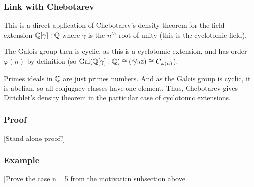 \subsubsection{Link with Chebotarev}
This is a direct application of Chebotarev's density theorem for the field extension $\mathbb{Q}[\gamma]:\mathbb{Q}$ where $\gamma$ is the $n^{th}$ root of unity (this is the cyclotomic field).

The Galois group then is cyclic, as this is a cyclotomic extension, and has order $\varphi(n)$ by definition (so $\text{Gal}(\mathbb{Q}[\gamma]:\mathbb{Q}) \cong \left( \nicefrac{\mathbb{Z}}{n\mathbb{Z}} \right) \cong C_{\varphi(n)}$).

Primes ideals in $\mathbb{Q}$ are just primes numbers. And as the Galois group is cyclic, it is abelian, so all conjugacy classes have one element.
Thus, Chebotarev gives Dirichlet's density theorem in the particular case of cyclotomic extensions.

\subsubsection{Proof}
[Stand alone proof?]

\subsubsection{Example}
[Prove the case n=15 from the motivation subsection above.]







